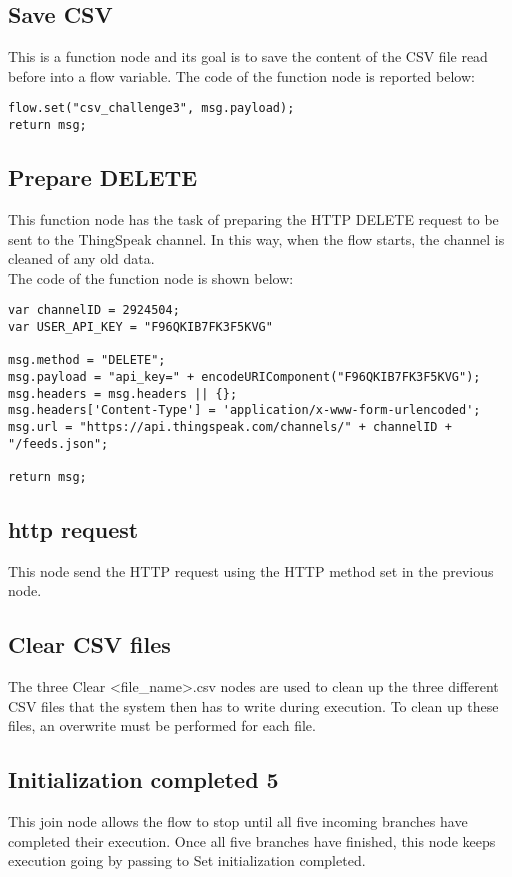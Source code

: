 \subsection{Save CSV}
This is a function node and its goal is to save the content of the CSV file read before into a flow variable.
The code of the function node is reported below:
\begin{verbatim}
flow.set("csv_challenge3", msg.payload);
return msg;
\end{verbatim}

\subsection{Prepare DELETE}
This function node has the task of preparing the HTTP DELETE request to be sent to the ThingSpeak channel.
In this way, when the flow starts, the channel is cleaned of any old data.\\
The code of the function node is shown below:
\begin{verbatim}
var channelID = 2924504;
var USER_API_KEY = "F96QKIB7FK3F5KVG"

msg.method = "DELETE";
msg.payload = "api_key=" + encodeURIComponent("F96QKIB7FK3F5KVG");
msg.headers = msg.headers || {};
msg.headers['Content-Type'] = 'application/x-www-form-urlencoded';
msg.url = "https://api.thingspeak.com/channels/" + channelID + "/feeds.json";

return msg;
\end{verbatim}

\subsection{http request}
This node send the HTTP request using the HTTP method set in the previous node.

\subsection{Clear CSV files}
The three Clear <file\_name>.csv nodes are used to clean up the three different CSV files that the system then has to write during execution. To clean up these files, an overwrite must be performed for each file.

\subsection{Initialization completed 5}
This join node allows the flow to stop until all five incoming branches have completed their execution. Once all five branches have finished, this node keeps execution going by passing to Set initialization completed.

